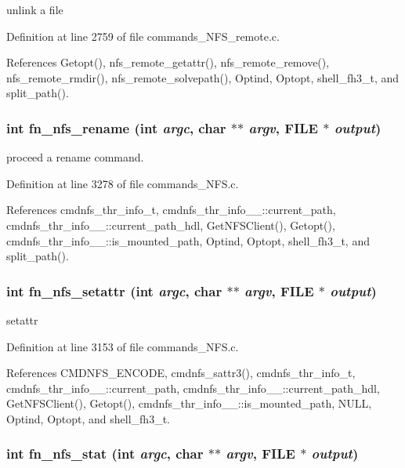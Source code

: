 unlink a file 

Definition at line 2759 of file commands\_\-NFS\_\-remote.c.

References Getopt(), nfs\_\-remote\_\-getattr(), nfs\_\-remote\_\-remove(), nfs\_\-remote\_\-rmdir(), nfs\_\-remote\_\-solvepath(), Optind, Optopt, shell\_\-fh3\_\-t, and split\_\-path().
\subsubsection{\setlength{\rightskip}{0pt plus 5cm}int fn\_\-nfs\_\-rename (int {\em argc}, char $\ast$$\ast$ {\em argv}, FILE $\ast$ {\em output})}\label{commands_8h_a74}


proceed a rename command. 

Definition at line 3278 of file commands\_\-NFS.c.

References cmdnfs\_\-thr\_\-info\_\-t, cmdnfs\_\-thr\_\-info\_\-\_\-::current\_\-path, cmdnfs\_\-thr\_\-info\_\-\_\-::current\_\-path\_\-hdl, Get\-NFSClient(), Getopt(), cmdnfs\_\-thr\_\-info\_\-\_\-::is\_\-mounted\_\-path, Optind, Optopt, shell\_\-fh3\_\-t, and split\_\-path().
\subsubsection{\setlength{\rightskip}{0pt plus 5cm}int fn\_\-nfs\_\-setattr (int {\em argc}, char $\ast$$\ast$ {\em argv}, FILE $\ast$ {\em output})}\label{commands_8h_a73}


setattr 

Definition at line 3153 of file commands\_\-NFS.c.

References CMDNFS\_\-ENCODE, cmdnfs\_\-sattr3(), cmdnfs\_\-thr\_\-info\_\-t, cmdnfs\_\-thr\_\-info\_\-\_\-::current\_\-path, cmdnfs\_\-thr\_\-info\_\-\_\-::current\_\-path\_\-hdl, Get\-NFSClient(), Getopt(), cmdnfs\_\-thr\_\-info\_\-\_\-::is\_\-mounted\_\-path, NULL, Optind, Optopt, and shell\_\-fh3\_\-t.
\subsubsection{\setlength{\rightskip}{0pt plus 5cm}int fn\_\-nfs\_\-stat (int {\em argc}, char $\ast$$\ast$ {\em argv}, FILE $\ast$ {\em output})}\label{commands_8h_a77}


